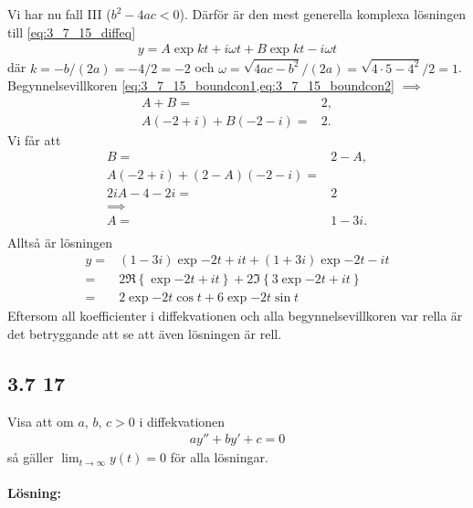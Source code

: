 Vi har nu fall III ($b^2 - 4 a c < 0$).
Därför är den mest generella komplexa lösningen till \cref{eq:3_7_15_diffeq}
\begin{align*}
	y = A \exp{k t + i \omega t} + B \exp{k t - i \omega t}
\end{align*}
där $k = -b / (2 a) = -4 / 2 = -2$ och $\omega = \sqrt{4 a c - b^2} / (2 a) = \sqrt{4 \cdot 5 - 4^2} / 2 = 1$.
Begynnelsevillkoren \cref{eq:3_7_15_boundcon1,eq:3_7_15_boundcon2} $\implies$
\begin{align*}
	A + B ={}& 2,\\
	A (-2 + i) + B (-2 - i) ={}& 2.
\end{align*}
Vi får att
\begin{align*}
	B ={}& 2 - A,\\
	A (-2 + i) + (2 - A) (-2 - i) ={}&\\
	2 i A - 4 - 2 i ={}& 2\\
	\implies&\\
	A ={}& 1 - 3 i.\\
\end{align*}
Alltså är lösningen
\begin{align*}
	y ={}& (1 - 3 i) \exp{-2 t + i t} + (1 + 3 i) \exp{-2 t - i t}\\
	={}& 2 \Re \left\{ \exp{-2 t + i t} \right\} + 2 \Im \left\{3 \exp{-2 t + i t} \right\}\\
	={}& 2 \exp{-2 t} \cos{t} + 6 \exp{-2 t} \sin{t}
\end{align*}
Eftersom all koefficienter i diffekvationen och alla begynnelsevillkoren var rella är det betryggande att se att även lösningen är rell.


\subsection{3.7 17}%
\label{sub:3_7_17}

Visa att om $a$, $b$, $c > 0$ i diffekvationen
\begin{align*}
	a y'' + b y' + c = 0
\end{align*}
så gäller $\lim_{t \to \infty} y(t) = 0$ för alla lösningar.

\paragraph{Lösning:}

